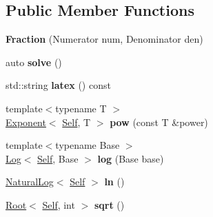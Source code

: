 \subsection*{Public Member Functions}
\begin{DoxyCompactItemize}
\item 
\hypertarget{classlatex_1_1math_1_1Fraction_ac7e62595c28e64ef4fc9fb622216dbc9}{{\bfseries Fraction} (Numerator num, Denominator den)}\label{classlatex_1_1math_1_1Fraction_ac7e62595c28e64ef4fc9fb622216dbc9}

\item 
\hypertarget{classlatex_1_1math_1_1Fraction_af7a4255e44caaf99035d77d4fd66b622}{auto {\bfseries solve} ()}\label{classlatex_1_1math_1_1Fraction_af7a4255e44caaf99035d77d4fd66b622}

\item 
\hypertarget{classlatex_1_1math_1_1Fraction_a5675fc996d2830ad3bf1cee4f1d1a697}{std\-::string {\bfseries latex} () const }\label{classlatex_1_1math_1_1Fraction_a5675fc996d2830ad3bf1cee4f1d1a697}

\item 
\hypertarget{classlatex_1_1math_1_1Fraction_a994da17277ce8a0ba77036c090e28444}{{\footnotesize template$<$typename T $>$ }\\\hyperlink{classlatex_1_1math_1_1Exponent}{Exponent}$<$ \hyperlink{classlatex_1_1math_1_1Fraction}{Self}, T $>$ {\bfseries pow} (const T \&power)}\label{classlatex_1_1math_1_1Fraction_a994da17277ce8a0ba77036c090e28444}

\item 
\hypertarget{classlatex_1_1math_1_1Fraction_a080092ade7e2ef160101bc20183cc34c}{{\footnotesize template$<$typename Base $>$ }\\\hyperlink{classlatex_1_1math_1_1Log}{Log}$<$ \hyperlink{classlatex_1_1math_1_1Fraction}{Self}, Base $>$ {\bfseries log} (Base base)}\label{classlatex_1_1math_1_1Fraction_a080092ade7e2ef160101bc20183cc34c}

\item 
\hypertarget{classlatex_1_1math_1_1Fraction_a70d16ff357336b72a85d6267c62eacd0}{\hyperlink{classlatex_1_1math_1_1NaturalLog}{Natural\-Log}$<$ \hyperlink{classlatex_1_1math_1_1Fraction}{Self} $>$ {\bfseries ln} ()}\label{classlatex_1_1math_1_1Fraction_a70d16ff357336b72a85d6267c62eacd0}

\item 
\hypertarget{classlatex_1_1math_1_1Fraction_ae34b20e7e198a4e46e6ecb72a6b0aa1b}{\hyperlink{classlatex_1_1math_1_1Root}{Root}$<$ \hyperlink{classlatex_1_1math_1_1Fraction}{Self}, int $>$ {\bfseries sqrt} ()}\label{classlatex_1_1math_1_1Fraction_ae34b20e7e198a4e46e6ecb72a6b0aa1b}

\end{DoxyCompactItemize}

